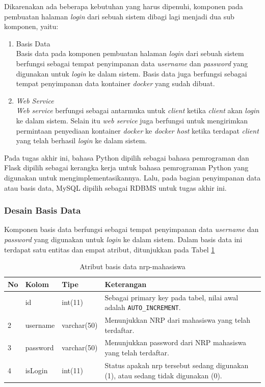 Dikarenakan ada beberapa kebutuhan yang harus dipenuhi, komponen pada pembuatan halaman \textit{login} dari sebuah sistem dibagi lagi menjadi dua sub komponen, yaitu:
\begin{enumerate}
	\item Basis Data \\
	Basis data pada komponen pembuatan halaman \textit{login} dari sebuah sistem berfungsi sebagai tempat penyimpanan data \textit{username} dan \textit{password} yang digunakan untuk \textit{login} ke dalam sistem. Basis data juga berfungsi sebagai tempat penyimpanan data kontainer \textit{docker} yang sudah dibuat.
	\item \textit{Web Service} \\
	\textit{Web service} berfungsi sebagai antarmuka untuk \textit{client} ketika \textit{client} akan \textit{login} ke dalam sistem. Selain itu \textit{web service} juga berfungsi untuk mengirimkan permintaan penyediaan kontainer \textit{docker} ke \textit{docker host} ketika terdapat \textit{client} yang telah berhasil \textit{login} ke dalam sistem.
\end{enumerate}

Pada tugas akhir ini, bahasa Python dipilih sebagai bahasa pemrograman dan Flask dipilih sebagai kerangka kerja untuk bahasa pemrograman Python yang digunakan untuk mengimplementasikannya. Lalu, pada bagian penyimpanan data atau basis data, MySQL dipilih sebagai RDBMS untuk tugas akhir ini.

\subsubsection{Desain Basis Data}
Komponen basis data berfungsi sebagai tempat penyimpanan data \textit{username} dan \textit{password} yang digunakan untuk \textit{login} ke dalam sistem. Dalam basis data ini terdapat satu entitas dan empat atribut, ditunjukkan pada Tabel \ref{tabelnrpmahasiswa}
\begin{longtable}{|p{}|p{}|p{}|p{}|}
	\caption{Atribut basis data nrp-mahasiswa} \label{tabelnrpmahasiswa} \\
	\hline
	\textbf{No} & \textbf{Kolom} & \textbf{Tipe} & \textbf{Keterangan} \\ \hline
	\endhead
	\endfoot
	\endlastfoot
	1 & id & int(11) & Sebagai primary key pada tabel, nilai awal adalah \texttt{AUTO\_INCREMENT}. \\ \hline
	2 & username & varchar(50) & Menunjukkan NRP dari mahasiswa yang telah terdaftar. \\ \hline
	3 & password & varchar(50) & Menunjukkan password dari NRP mahasiswa yang telah terdaftar. \\ \hline
	4 & isLogin & int(11) & Status apakah nrp tersebut sedang digunakan (1), atau sedang tidak digunakan (0). \\ \hline
\end{longtable}
